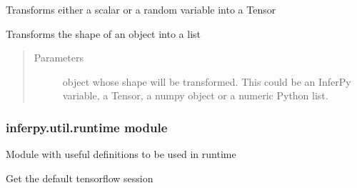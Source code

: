 \documentclass[letterpaper,10pt,english]{sphinxmanual}
\begin{document}

\begin{fulllineitems}
\label{\detokenize{modules/inferpy.util:inferpy.util.ops.param_to_tf}}
Transforms either a scalar or a random variable into a Tensor

\end{fulllineitems}


\begin{fulllineitems}
\label{\detokenize{modules/inferpy.util:inferpy.util.ops.shape_to_list}}
Transforms the shape of an object into a list
\begin{quote}\begin{description}
\item[{Parameters}] \leavevmode
{} \textendash{} object whose shape will be transformed. This could be an InferPy variable, a Tensor, a numpy object or a numeric Python list.

\end{description}\end{quote}

\end{fulllineitems}



\subsubsection{inferpy.util.runtime module}
\label{\detokenize{modules/inferpy.util:module-inferpy.util.runtime}}\label{\detokenize{modules/inferpy.util:inferpy-util-runtime-module}}
Module with useful definitions to be used in runtime

\begin{fulllineitems}
\label{\detokenize{modules/inferpy.util:inferpy.util.runtime.get_session}}
Get the default tensorflow session

\end{fulllineitems}
\end{document}
